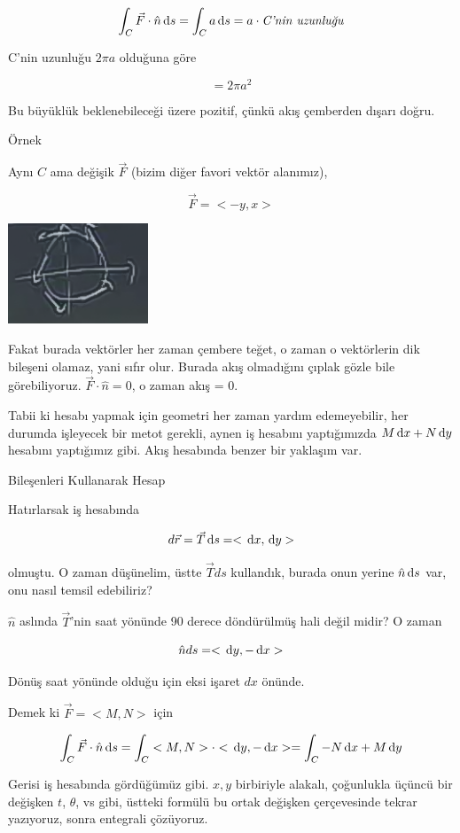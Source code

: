 \documentclass[12pt,fleqn]{article}\usepackage{../../common}
\begin{document}
$$ \int_C \vec{F} \cdot \hat{n} \,\mathrm{d} s 
= \int_C a \,\mathrm{d} s  = a \cdot \textit{C'nin uzunluğu}
$$

C'nin uzunluğu $2\pi a$ olduğuna göre

$$ = 2\pi a^2 $$

Bu büyüklük beklenebileceği üzere pozitif, çünkü akış çemberden dışarı doğru.

Örnek

Aynı $C$ ama değişik $\vec{F}$ (bizim diğer favori vektör alanımız), 

$$ \vec{F} = < -y,x > $$

\includegraphics[height=3cm]{23_7.png}

Fakat burada vektörler her zaman çembere teğet, o zaman o vektörlerin dik
bileşeni olamaz, yani sıfır olur. Burada akış olmadığını çıplak gözle bile
görebiliyoruz. $\vec{F} \cdot \hat{n} = 0$, o zaman akış = 0. 

Tabii ki hesabı yapmak için geometri her zaman yardım edemeyebilir, her durumda
işleyecek bir metot gerekli, aynen iş hesabını yaptığımızda $M \,\mathrm{d} x + N \,\mathrm{d} y$
hesabını yaptığımız gibi. Akış hesabında benzer bir yaklaşım var.

Bileşenleri Kullanarak Hesap

Hatırlarsak iş hesabında 

$$ d\vec{r} = \vec{T} \,\mathrm{d} s = < \,\mathrm{d} x, \,\mathrm{d} y > $$

olmuştu. O zaman düşünelim, üstte $\vec{T} ds$ kullandık, burada onun
yerine $\hat{n} \,\mathrm{d} s$ var, onu nasıl temsil edebiliriz? 

$\hat{n}$ aslında $\vec{T}$'nin saat yönünde 90 derece döndürülmüş hali
değil midir? O zaman 

$$ \hat{n}ds = < \,\mathrm{d} y,-\,\mathrm{d} x > $$

Dönüş saat yönünde olduğu için eksi işaret $dx$ önünde. 

Demek ki $\vec{F} = < M,N >$ için

$$
\int_C \vec{F} \cdot \hat{n} \,\mathrm{d} s =
\int_C  < M,N > \cdot < \,\mathrm{d} y,-\,\mathrm{d} x > =  \int_C -N \,\mathrm{d} x + M \,\mathrm{d} y
$$

Gerisi iş hesabında gördüğümüz gibi. $x,y$ birbiriyle alakalı, çoğunlukla
üçüncü bir değişken $t$, $\theta$, vs gibi, üstteki formülü bu ortak
değişken çerçevesinde tekrar yazıyoruz, sonra entegrali çözüyoruz. 
\end{document}
